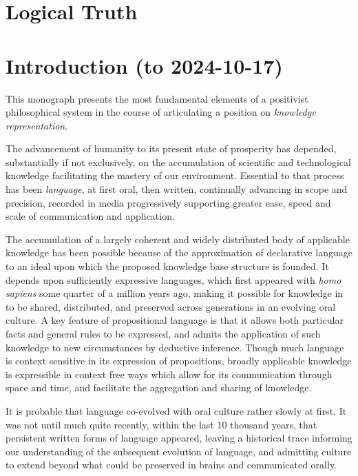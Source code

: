 \documentclass[10pt,titlepage]{book}
\begin{document}
\chapter{Logical Truth}

\appendix
  
\chapter{Introduction (to 2024-10-17)}

This monograph presents the most fundamental elements of a positivist philosophical system in the course of articulating a position on \emph{knowledge representation}.

The advancement of humanity to its present state of prosperity has depended, substantially if not exclusively, on the accumulation of scientific and technological knowledge facilitating the mastery of our environment.
Essential to that process has been \emph{language}, at first oral, then written, continually advancing in scope and precision, recorded in media progressively supporting greater ease, speed and scale of communication and application.

The accumulation of a largely coherent and widely distributed body of applicable knowledge has been possible because of the approximation of declarative language to an ideal upon which the proposed knowledge base structure is founded.
It depends upon sufficiently expressive languages, which first appeared with \emph{homo sapiens} some quarter of a million years ago, making it possible for knowledge in to be shared, distributed, and preserved across generations in an evolving oral culture.
A key feature of propositional language is that it allows both particular facts and general rules to be expressed, and admits the application of such knowledge to new circumstances by deductive inference.
Though much language is context sensitive in its expression of propositions, broadly applicable knowledge is expressible in context free ways which allow for its communication through space and time, and facilitate the aggregation and sharing of knowledge.

It is probable that language co-evolved with oral culture rather slowly at first.
It was not until much quite recently, within the last 10 thousand years, that persistent written forms of language appeared, leaving a historical trace informing our understanding of the subsequent evolution of language, and admitting culture to extend beyond what could be preserved in brains and communicated orally.
\end{document}
